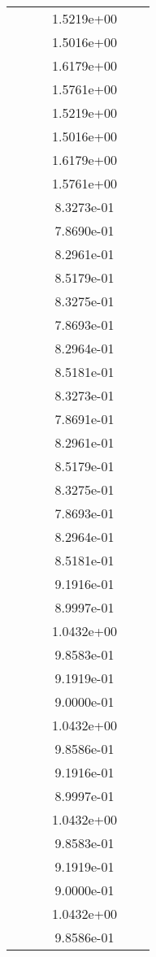 \begin{xltabular}{\textwidth}{r|rS[table-format=1.3e+2]S[table-format=1.4e+2]S[table-format=1.4e+2]S[table-format=-1.5]}
&  &  & 1.5219e+00 & & \\
&  &  & 1.5016e+00 & & \\
&  &  & 1.6179e+00 & & \\
&  &  & 1.5761e+00 & & \\
&  &  & 1.5219e+00 & & \\
&  &  & 1.5016e+00 & & \\
&  &  & 1.6179e+00 & & \\
&  &  & 1.5761e+00 & & \\
&  &  & 8.3273e-01 & & \\
&  &  & 7.8690e-01 & & \\
&  &  & 8.2961e-01 & & \\
&  &  & 8.5179e-01 & & \\
&  &  & 8.3275e-01 & & \\
&  &  & 7.8693e-01 & & \\
&  &  & 8.2964e-01 & & \\
&  &  & 8.5181e-01 & & \\
&  &  & 8.3273e-01 & & \\
&  &  & 7.8691e-01 & & \\
&  &  & 8.2961e-01 & & \\
&  &  & 8.5179e-01 & & \\
&  &  & 8.3275e-01 & & \\
&  &  & 7.8693e-01 & & \\
&  &  & 8.2964e-01 & & \\
&  &  & 8.5181e-01 & & \\
&  &  & 9.1916e-01 & & \\
&  &  & 8.9997e-01 & & \\
&  &  & 1.0432e+00 & & \\
&  &  & 9.8583e-01 & & \\
&  &  & 9.1919e-01 & & \\
&  &  & 9.0000e-01 & & \\
&  &  & 1.0432e+00 & & \\
&  &  & 9.8586e-01 & & \\
&  &  & 9.1916e-01 & & \\
&  &  & 8.9997e-01 & & \\
&  &  & 1.0432e+00 & & \\
&  &  & 9.8583e-01 & & \\
&  &  & 9.1919e-01 & & \\
&  &  & 9.0000e-01 & & \\
&  &  & 1.0432e+00 & & \\
&  &  & 9.8586e-01 & & \\

\end{xltabular}
